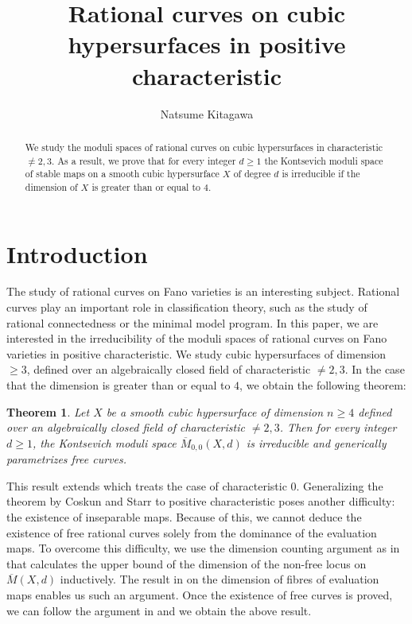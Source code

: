 \documentclass[dvipdfmx, 12pt, a4paper]{amsart}
\theoremstyle{plain}
\newtheorem{thm}{Theorem}[section]
\theoremstyle{definition}
\theoremstyle{remark}
\newcommand{\ol}{\overline}
\begin{document}
	
\title[Rational curves on cubic hypersurfaces]{Rational curves on cubic hypersurfaces in positive characteristic}
\author{Natsume Kitagawa}
\address{Graduate School of Mathematics, Nagoya University, Furocho Chikusa-ku, Nagoya, 464-8602, Japan}
\maketitle

\begin{abstract}
	We study the moduli spaces of rational curves on cubic hypersurfaces in characteristic $\neq2,3$. As a result, we prove that for every integer $d\geq1$ the Kontsevich moduli space of stable maps on a smooth cubic hypersurface $X$ of degree $d$ is irreducible if the dimension of $X$ is greater than or equal to $4$.
\end{abstract}

\tableofcontents

\section{Introduction}

	The study of rational curves on Fano varieties is an interesting subject. Rational curves play an important role in classification theory, such as the study of rational connectedness or the minimal model program.
	In this paper, we are interested in the irreducibility of the moduli spaces of rational curves on Fano varieties in positive characteristic.
	We study cubic hypersurfaces of dimension $\geq3$, defined over an algebraically closed field of characteristic $\neq2,3$. In the case that the dimension is greater than or equal to $4$, we obtain the following theorem:
	
	\begin{thm}\label{MainThm}
		Let $X$ be a smooth cubic hypersurface of dimension $n\geq4$ defined over an algebraically closed field of characteristic $\neq2,3$. Then for every integer $d\geq1$, the Kontsevich moduli space $\ol{M}_{0,0}(X,d)$ is irreducible and generically parametrizes free curves.
	\end{thm}
	
	This result extends \cite[Theorem 1.1]{CoskunStarr2009} which treats the case of characteristic $0$. Generalizing the theorem by Coskun and Starr to positive characteristic poses another difficulty: the existence of inseparable maps. Because of this, we cannot deduce the existence of free rational curves solely from the dominance of the evaluation maps.
	To overcome this difficulty, we use the dimension counting argument as in \cite{BeheshtiRiedl2021linear} that calculates the upper bound of the dimension of the non-free locus on $\ol{M}(X,d)$ inductively. The result in \cite{glas2025} on the dimension of fibres of evaluation maps enables us such an argument. Once the existence of free curves is proved, we can follow the argument in \cite[Proof of Theorem 1.1]{CoskunStarr2009} and we obtain the above result.
	
\end{document}
